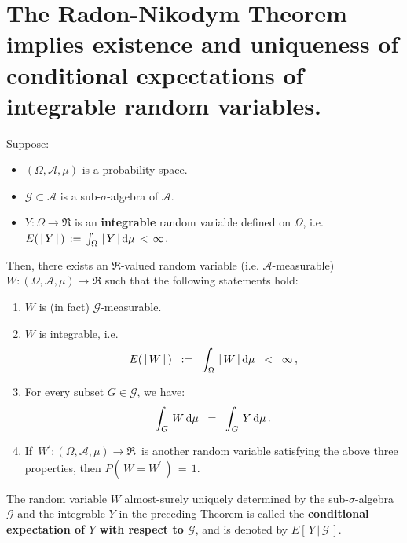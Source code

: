 

\section{The Radon-Nikodym Theorem implies existence and uniqueness of conditional expectations of integrable random variables.}
\setcounter{theorem}{0}
\setcounter{equation}{0}

\renewcommand{\theenumi}{\roman{enumi}}
\renewcommand{\labelenumi}{\textnormal{(\theenumi)}$\;\;$}


\begin{theorem}
\label{Thm:ExistenceConditionalExpectation}
\mbox{}\vskip 0.2cm
\noindent
Suppose:
\begin{itemize}
\item
	$(\Omega,\mathcal{A},\mu)$ is a probability space.
\item
	$\mathcal{G} \subset \mathcal{A}$ is a sub-$\sigma$-algebra of $\mathcal{A}$.
\item
	$Y : \Omega \longrightarrow \Re$ is an \textbf{\color{red}integrable} random variable defined on $\Omega$,
	i.e. $E\!\left(\,\vert\,Y\,\vert\,\right) \,:=\, \int_{\Omega}\, \vert\, Y\,\vert \,\textnormal{d}\mu \,<\, \infty$.
\end{itemize}
Then, there exists an $\Re$-valued random variable (i.e. $\mathcal{A}$-measurable)
$W : (\Omega,\mathcal{A},\mu) \longrightarrow \Re$ such that the following statements hold:
\begin{enumerate}
\item
	$W$ is (in fact) $\mathcal{G}$-measurable.
\item
	$W$ is integrable, i.e.
	\begin{equation*}
	E\!\left(\,\vert\,W\,\vert\,\right)
	\;\; := \;\;
	\int_{\Omega}\,\vert\,W\,\vert\,\textnormal{d}\mu
	\;\; < \;\;
	\infty\,,
	\end{equation*}
\item
	For every subset $G \in \mathcal{G}$, we have:
	\begin{equation*}
	\int_{G}\, W \,\textnormal{d}\mu
	\;\; = \;\;
	\int_{G}\, Y \,\textnormal{d}\mu\,.
	\end{equation*}
\item
	If \,$W^{\prime} : (\Omega,\mathcal{A},\mu) \longrightarrow \Re$\, is another
	random variable satisfying the above three properties, then
	$P\!\left(\,W = W^{\prime}\,\right) \,=\, 1$. 
\end{enumerate}
\end{theorem}

\begin{remark}\mbox{}\vskip 0.1cm\noindent
The random variable $W$ almost-surely uniquely determined
by the sub-$\sigma$-algebra $\mathcal{G}$ and the integrable $Y$
in the preceding Theorem is called the
\textbf{conditional expectation of $Y$ with respect to $\mathcal{G}$}, and is denoted
by $E\!\left[\,Y\,\vert\,\mathcal{G}\,\right]$.
\end{remark}

